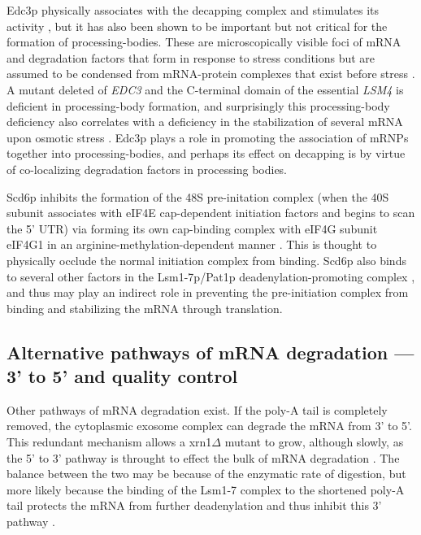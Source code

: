 Edc3p
physically associates with the decapping complex and stimulates its
activity \parencite{nissan2010decapping}, 
but it has also been shown to be
important \parencite{decker2007edc3p,huch2016decapping} but not critical 
\parencite{rao2017numerous}
for the formation of processing-bodies. 
These are
microscopically visible foci of mRNA and degradation factors that form
in response to stress conditions but are assumed to be condensed from
mRNA-protein complexes that exist before stress 
\parencite{sheth2003decapping,lui2014granules,rao2017numerous}. 
A mutant deleted of \textit{EDC3} and the C-terminal domain of the
essential \textit{LSM4} is deficient in processing-body formation, 
and surprisingly this processing-body deficiency also correlates with a
deficiency in the stabilization of several mRNA upon osmotic stress
\parencite{huch2017mrna}. 
Edc3p plays a role in promoting the association of mRNPs
together into processing-bodies, and perhaps its effect on 
decapping is by virtue of co-localizing degradation factors in 
processing bodies.



Scd6p inhibits the formation of the 48S pre-initation complex
(when the 40S subunit associates with eIF4E cap-dependent initiation
factors and begins to scan the 5' UTR) via forming its own cap-binding
complex with eIF4G subunit eIF4G1 in an arginine-methylation-dependent
manner \parencite{rajyaguru2012scd6,poornima2016arginine}. 
This is thought
to physically occlude the normal initiation complex from binding.
Scd6p also binds to several other factors in the Lsm1-7p/Pat1p
deadenylation-promoting complex \parencite{nissan2010decapping}, 
and thus may play an indirect role in preventing the pre-initiation 
complex from binding and stabilizing the mRNA through translation.  

\subsection{Alternative pathways of mRNA degradation ---
3' to 5' and quality control}

Other pathways
of mRNA degradation exist. If the poly-A tail is completely removed,
the cytoplasmic exosome complex can degrade the mRNA from 3' to 5'.
This redundant mechanism allows a xrn1$\Delta$ mutant to grow, although
slowly, as the 5' to 3' pathway is throught to effect the bulk of mRNA
degradation \parencite{parker2012rna}. 
The balance between the two may be because
of the enzymatic rate of digestion, but more likely because the
binding of the Lsm1-7 complex to the shortened poly-A tail protects
the mRNA from further deadenylation and thus inhibit this 3' pathway
\parencite{tharun2009lsm1}.

